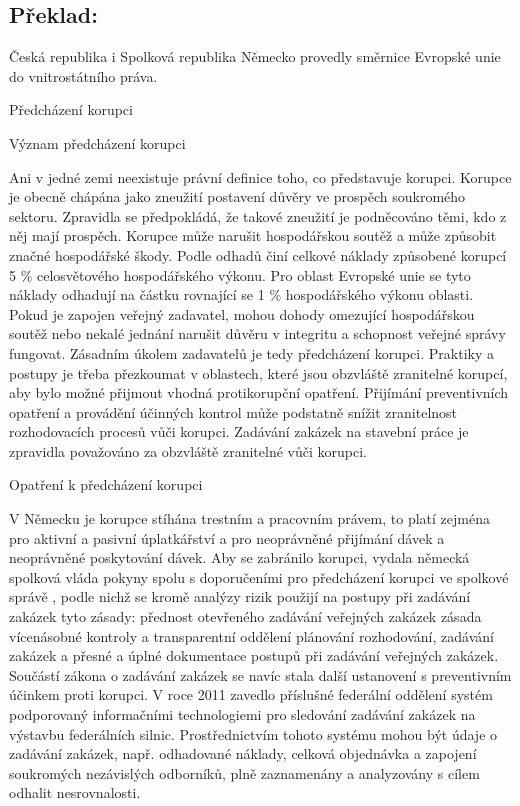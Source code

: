 \documentclass[10pt]{article}
\begin{document}
\pagebreak

\subsection*{Překlad:}

Česká republika i Spolková republika Německo provedly směrnice Evropské unie do vnitrostátního práva.


Předcházení korupci



Význam předcházení korupci

Ani v jedné zemi neexistuje právní definice toho, co představuje korupci.
Korupce je obecně chápána jako zneužití postavení důvěry ve prospěch soukromého sektoru.
Zpravidla se předpokládá, že takové zneužití je podněcováno těmi, kdo z něj mají prospěch.
Korupce může narušit hospodářskou soutěž a může způsobit značné hospodářské škody.
Podle odhadů činí celkové náklady způsobené korupcí 5 \% celosvětového hospodářského výkonu.
Pro oblast Evropské unie se tyto náklady odhadují na částku rovnající se 1 \% hospodářského výkonu oblasti.
Pokud je zapojen veřejný zadavatel, mohou dohody omezující hospodářskou soutěž nebo nekalé jednání narušit důvěru v integritu a schopnost veřejné správy fungovat.
Zásadním úkolem zadavatelů je tedy předcházení korupci.
Praktiky a postupy je třeba přezkoumat v oblastech, které jsou obzvláště zranitelné korupcí, aby bylo možné přijmout vhodná protikorupční opatření.
Přijímání preventivních opatření a provádění účinných kontrol může podstatně snížit zranitelnost rozhodovacích procesů vůči korupci.
Zadávání zakázek na stavební práce je zpravidla považováno za obzvláště zranitelné vůči korupci.


Opatření k předcházení korupci

V Německu je korupce stíhána trestním a pracovním právem, to platí zejména pro aktivní a pasivní úplatkářství a pro neoprávněné přijímání dávek a neoprávněné poskytování dávek.
Aby se zabránilo korupci, vydala německá spolková vláda pokyny spolu s doporučeními pro předcházení korupci ve spolkové správě , podle nichž se kromě analýzy rizik použijí na postupy při zadávání zakázek tyto zásady: přednost otevřeného zadávání veřejných zakázek zásada vícenásobné kontroly a transparentní oddělení plánování rozhodování, zadávání zakázek a přesné a úplné dokumentace postupů při zadávání veřejných zakázek.
Součástí zákona o zadávání zakázek se navíc stala další ustanovení s preventivním účinkem proti korupci.
V roce 2011 zavedlo příslušné federální oddělení systém podporovaný informačními technologiemi pro sledování zadávání zakázek na výstavbu federálních silnic.
Prostřednictvím tohoto systému mohou být údaje o zadávání zakázek, např. odhadované náklady, celková objednávka a zapojení soukromých nezávislých odborníků, plně zaznamenány a analyzovány s cílem odhalit nesrovnalosti.
\end{document}
